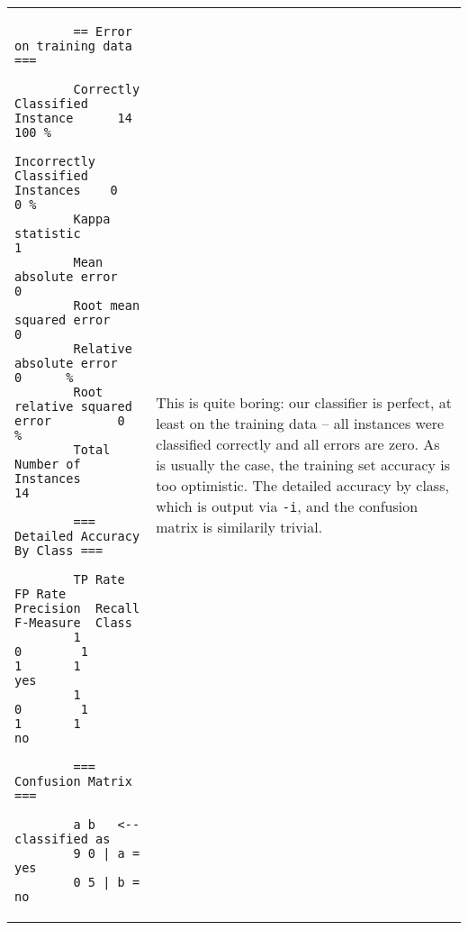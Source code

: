 \vspace{0.5cm}
\noindent
\begin{tabular}{l l}
	\begin{minipage}{7cm}
		{\scriptsize
		\begin{verbatim}
		== Error on training data ===
		
		Correctly Classified Instance      14      100 %
		Incorrectly Classified Instances    0      0 %
		Kappa statistic                     1     
		Mean absolute error                 0     
		Root mean squared error             0     
		Relative absolute error             0      %
		Root relative squared error         0      %
		Total Number of Instances          14     
		
		=== Detailed Accuracy By Class ===
		
		TP Rate  FP Rate  Precision  Recall  F-Measure  Class
		1        0        1          1       1          yes
		1        0        1          1       1          no
		
		=== Confusion Matrix ===
		
		a b   <-- classified as
		9 0 | a = yes
		0 5 | b = no
		\end{verbatim}}
	\end{minipage}
	&
	\begin{minipage}{5cm}
	This is quite boring: our classifier is perfect, at least on the training data -- all instances were classified correctly and all errors are zero. As is usually the case, the training set accuracy is too optimistic. The detailed accuracy by class, which is output via \texttt{-i}, and the confusion matrix is similarily trivial.
	\end{minipage}
	\\
\end{tabular}

